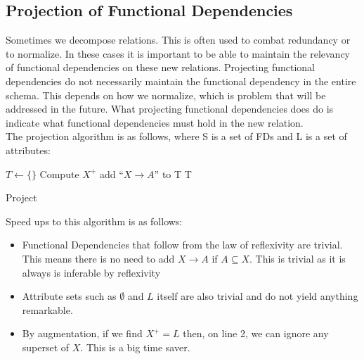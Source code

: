 \documentclass{report}
\begin{document}
        \subsection{Projection of Functional Dependencies}

        
        Sometimes we decompose relations. This is often used to combat redundancy or to normalize. In these cases it is important to be able to maintain the relevancy of functional dependencies on these new relations. Projecting functional dependencies do not necessarily maintain the functional dependency in the entire schema. This depends on how we normalize, which is problem that will be addressed in the future. What projecting functional dependencies does do is indicate what functional dependencies must hold in the new relation.\\
        The projection algorithm is as follows, where S is a set of FDs and L is a set of attributes:
        \vspace{.5cm}
        

        \begin{algorithm}[H]
            \vspace{.2cm}
            \SetAlgoLined
            \SetNoFillComment
            $T \leftarrow \{\}$\;
             {
                Compute $X^+$\;
                 {
                     {
                        add ``$X \rightarrow A$'' to T\;
                    }
                }
            }
            \Return T\;
            \caption{Project}
        \end{algorithm}

        Speed ups to this algorithm is as follows:
        \begin{itemize}
            \item Functional Dependencies that follow from the law of reflexivity are trivial. This means there is no need to add $X\rightarrow A$ if $A\subseteq X$. This is trivial as it is always is inferable by reflexivity
            \item Attribute sets such as $\emptyset$ and $L$ itself are also trivial and do not yield anything remarkable.
            \item By augmentation, if we find $X^+=L$ then, on line 2, we can ignore any superset of $X$. This is a big time saver.
        \end{itemize}
\end{document}
